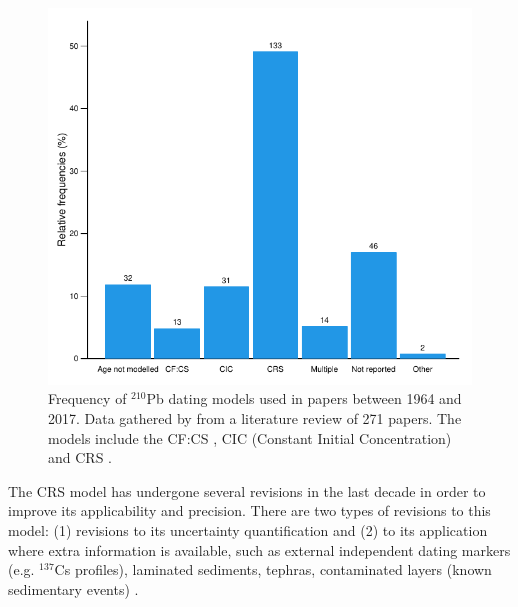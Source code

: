 \documentclass [10pt] {article}
\begin{document}
\begin{figure}[h!]
	\begin{centering}
		\includegraphics[width=.75\linewidth]{barras.pdf}
		\caption{Frequency of $^{210}$Pb dating models used in papers between 1964 and 2017. Data gathered by \citet{Courtney2019} from a literature review of 271 papers. The models include the CF:CS \citep[Constant Flux - Constant Sedimentation;][]{Robbins1978}, CIC (Constant Initial Concentration) \citep{Goldberg1963,Crozaz1964,Robbins1978} and CRS  \citep[Constant Rate of Supply;][]{Appleby1978,Robbins1978}. }
		\label{fig:210models}
	\end{centering}
\end{figure}

	The CRS model has undergone several revisions in the last decade in order to improve its applicability and precision. 
There are two types of revisions to this model: (1) revisions to its uncertainty quantification \citep[eg. ][]{Binford1990,Appleby2001,Sanchez-Cabeza2014} and (2) to its application where extra information is available, such as external independent dating markers (e.g. $^{137}$Cs profiles), laminated sediments, tephras, contaminated layers (known sedimentary events) \citep[eg.][]{Appleby1998,Appleby2001,Appleby2008}. 
\end{document}

